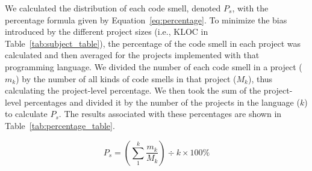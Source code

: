 


We calculated the distribution of each code smell, denoted $P_{s}$, with the
percentage formula given by Equation~\ref{eq:percentage}. To minimize the bias
introduced by the different project sizes (i.e., KLOC in
Table~\ref{tab:subject_table}), the percentage of the code smell in each project
was calculated and then averaged for the projects implemented with that
programming language.
%
We divided the number of each code smell in a project ($m_{k}$) by the number of
all kinds of code smells in that project ({$M_{k}$}), thus calculating the
project-level percentage. We then took the sum of the project-level percentages
and divided it by the number of the projects in the language ($k$) to calculate
$P_{s}$. The results associated with these percentages are shown in
Table~\ref{tab:percentage_table}.


\begin{equation}
P_{s} = \left( \sum_{1}^{k}\frac{{m_{k}}}{M_{k}} \right) \div {k} \times 100\%
\label{eq:percentage}
\end{equation}


